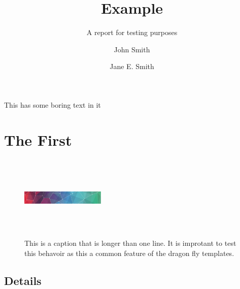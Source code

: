 \documentclass{dragonfly-report}
\title{Example}{An Example\\ Report about \emph{sheep}}
\subtitle{A report for testing purposes}
\author{John Smith \and Jane E. Smith}
\begin{document}
\maketitle
\tableofcontents

\summary%
This has some boring text in it

\section{The First}
\lipsum[1]


\begin{figure}[h]
  \includegraphics[width=40mm,height=40mm]{pattern}
  \caption{This is a caption that is longer than one line. It is improtant to test 
  this behavoir as this a common feature of the dragon fly templates.}
\end{figure}

\subsection{Details}

\lipsum[2]
\end{document}
